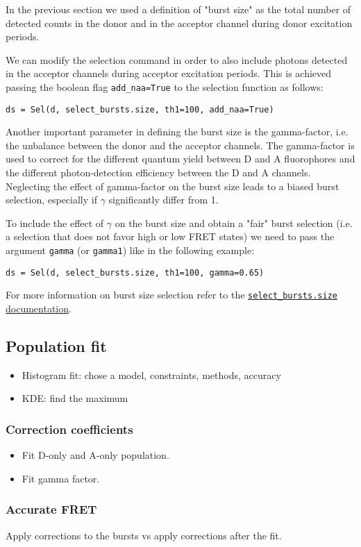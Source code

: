 In the previous section we used a definition of "burst size" as the total number of detected counts in the donor and in the acceptor channel during donor excitation periods. 

We can modify the selection command in order to also include photons detected in the acceptor channels during acceptor excitation periods. This is achieved passing the boolean flag \verb|add_naa=True| to the selection function as follows:

\begin{verbatim}
ds = Sel(d, select_bursts.size, th1=100, add_naa=True)
\end{verbatim}

Another important parameter in defining the burst size is the gamma-factor, i.e. the unbalance between the donor and the acceptor channels. The gamma-factor is used to correct for the different quantum yield between D and A fluorophores and the different photon-detection efficiency between the D and A channels. Neglecting the effect of gamma-factor on the burst size leads to a biased burst selection, especially if $\gamma$ significantly differ from 1. 

To include the effect of $\gamma$ on the burst size and obtain a "fair" burst selection (i.e. a selection that does not favor high or low FRET states) we
need to pass the argument \verb|gamma| (or \verb|gamma1|) like in the following example:

\begin{verbatim}
ds = Sel(d, select_bursts.size, th1=100, gamma=0.65)
\end{verbatim}

For more information on burst size selection refer to the \href{http://fretbursts.readthedocs.org/en/latest/burst_selection.html#fretbursts.select_bursts.size}{\verb|select_bursts.size| documentation}.

\subsection{Population fit}

\begin{itemize}
\item Histogram fit: chose a model, constraints, methods, accuracy
\item KDE: find the maximum
\end{itemize}

\subsubsection{Correction coefficients}

\begin{itemize}
\item Fit D-only and A-only population.
\item Fit gamma factor.
\end{itemize}


\subsubsection{Accurate FRET}

Apply corrections to the bursts vs apply corrections after the fit.


